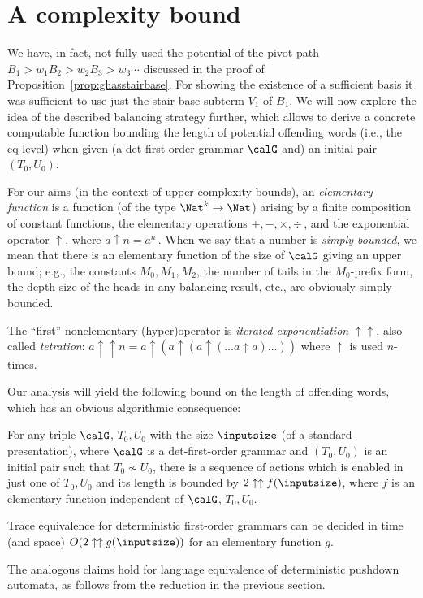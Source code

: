 \documentclass[12pt]{article}
\begin{document}
\section{ A complexity bound}
\label{sec:complexitybound}

We have, in fact, not fully used the potential of the
pivot-path
$B_1\gt{w_1} B_2\gt{w_2}B_3\gt{w_3}\cdots$ discussed in the proof of 
Proposition~\ref{prop:ghasstairbase}.
For showing the existence of a sufficient basis
it was
sufficient to use just the stair-base subterm $V_1$ of $B_1$. 
We will now explore the idea of the described balancing strategy
further, which allows to derive a concrete computable function bounding the
length of potential offending words (i.e., the eq-level) when given
(a det-first-order grammar $\calG$ and) an initial pair $(T_0,U_0)$.


For our aims 
(in the context of upper complexity bounds),
an \emph{elementary function}
is a function (of the type $\Nat^k\rightarrow \Nat$)
arising by a finite composition of
constant
functions,
the elementary operations $+, -,\times, \div$\,, 
and the exponential operator $\uparrow$, where 
$a\uparrow n=a^n$\,.
When we say that a number is \emph{simply bounded}, we mean that there
is an elementary function of the size of $\calG$ giving an upper
bound; e.g., the constants $M_0,M_1,M_2$, the number of tails in the
$M_0$-prefix form, the depth-size of the heads in any balancing
result, etc., are obviously simply bounded.

The ``first'' nonelementary (hyper)operator is 
\emph{iterated exponentiation} $\uparrow\uparrow$,
also called \emph{tetration}:
$a\uparrow\uparrow n= 
a\uparrow (a\uparrow (a\uparrow ( \dots a \uparrow a )\dots ))$
where $\uparrow$ is used $n$-times.


Our analysis will yield the following bound on the length of
offending words, which has an obvious algorithmic consequence:

\begin{theorem}\label{th:lengthbound}
For any triple $\calG$, $T_0,U_0$ 
with the size $\inputsize$ (of a standard presentation),
where $\calG$ is a det-first-order grammar and 
$(T_0,U_0)$ is an initial pair such that $T_0\not\sim U_0$,
there is a sequence of actions 
which is enabled in just one of
 $T_0, U_0$ and its length is bounded by
$2\uparrow\uparrow f(\inputsize)$, where $f$ is an elementary
function independent of $\calG$, $T_0, U_0$.
\end{theorem}

\begin{cor}
Trace 
equivalence 
for deterministic first-order grammars
can be decided 
in time (and space) 
$O(2\uparrow\uparrow g(\inputsize))$
for an elementary function $g$.
\end{cor}
The analogous claims hold for language
 equivalence of deterministic pushdown automata, as follows from the
 reduction in the previous section.
\end{document}
